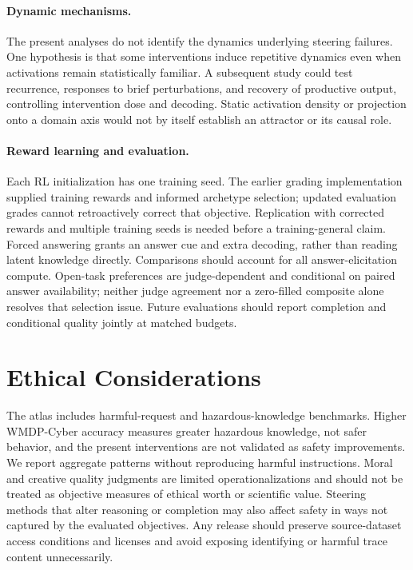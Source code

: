 \paragraph{Dynamic mechanisms.}
The present analyses do not identify the dynamics underlying steering failures. One hypothesis is that some interventions induce repetitive dynamics even when activations remain statistically familiar. A subsequent study could test recurrence, responses to brief perturbations, and recovery of productive output, controlling intervention dose and decoding. Static activation density or projection onto a domain axis would not by itself establish an attractor or its causal role.

\paragraph{Reward learning and evaluation.}
Each RL initialization has one training seed. The earlier grading implementation supplied training rewards and informed archetype selection; updated evaluation grades cannot retroactively correct that objective. Replication with corrected rewards and multiple training seeds is needed before a training-general claim. Forced answering grants an answer cue and extra decoding, rather than reading latent knowledge directly. Comparisons should account for all answer-elicitation compute. Open-task preferences are judge-dependent and conditional on paired answer availability; neither judge agreement nor a zero-filled composite alone resolves that selection issue. Future evaluations should report completion and conditional quality jointly at matched budgets.

\section*{Ethical Considerations}
The atlas includes harmful-request and hazardous-knowledge benchmarks. Higher WMDP-Cyber accuracy measures greater hazardous knowledge, not safer behavior, and the present interventions are not validated as safety improvements. We report aggregate patterns without reproducing harmful instructions. Moral and creative quality judgments are limited operationalizations and should not be treated as objective measures of ethical worth or scientific value. Steering methods that alter reasoning or completion may also affect safety in ways not captured by the evaluated objectives. Any release should preserve source-dataset access conditions and licenses and avoid exposing identifying or harmful trace content unnecessarily.
